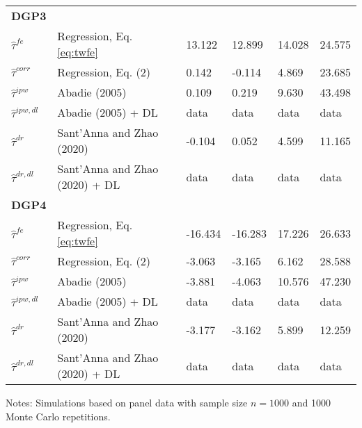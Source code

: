 \begin{table}[htbp]
{\begin{threeparttable}
\begin{tabular}{llllll}
\addlinespace
\large \textbf{DGP3}            &                                   &            &             &      &           \\
\addlinespace
$\hat{\tau}^{fe}$ & Regression, Eq. \eqref{eq:twfe}               & 13.122       & 12.899       & 14.028 & 24.575     \\
$\hat{\tau}^{corr}$ & Regression, Eq. (2)             & 0.142       & -0.114       & 4.869 & 23.685    \\
$\hat{\tau}^{ipw}$ & Abadie (2005)                    & 0.109     & 0.219      & 9.630 & 43.498     \\
$\hat{\tau}^{ipw,dl}$ & Abadie (2005) + DL            & data       & data        & data & data      \\
$\hat{\tau}^{dr}$ & Sant'Anna and Zhao (2020)         & -0.104       & 0.052        & 4.599 & 11.165      \\
$\hat{\tau}^{dr,dl}$ & Sant'Anna and Zhao (2020) + DL & data       & data        & data & data      \\  \midrule


\addlinespace
\large \textbf{DGP4}            &                                   &            &             &      &           \\
\addlinespace
$\hat{\tau}^{fe}$ & Regression, Eq. \eqref{eq:twfe}              & -16.434       & -16.283        & 17.226 & 26.633     \\
$\hat{\tau}^{corr}$ & Regression, Eq. (2)             & -3.063       & -3.165       & 6.162 & 28.588     \\
$\hat{\tau}^{ipw}$ & Abadie (2005)                    & -3.881       & -4.063        & 10.576 & 47.230      \\
$\hat{\tau}^{ipw,dl}$ & Abadie (2005) + DL            & data       & data        & data & data      \\
$\hat{\tau}^{dr}$ & Sant'Anna and Zhao (2020)         &-3.177      &-3.162       & 5.899 & 12.259      \\
$\hat{\tau}^{dr,dl}$ & Sant'Anna and Zhao (2020) + DL & data       & data        & data & data      \\


\bottomrule
\end{tabular}
\vspace{1em}
\begin{tablenotes}
\item Notes: Simulations based on panel data with sample size $n = 1000$ and 1000 Monte Carlo repetitions.
\end{tablenotes}
\end{threeparttable}}
\end{table}
